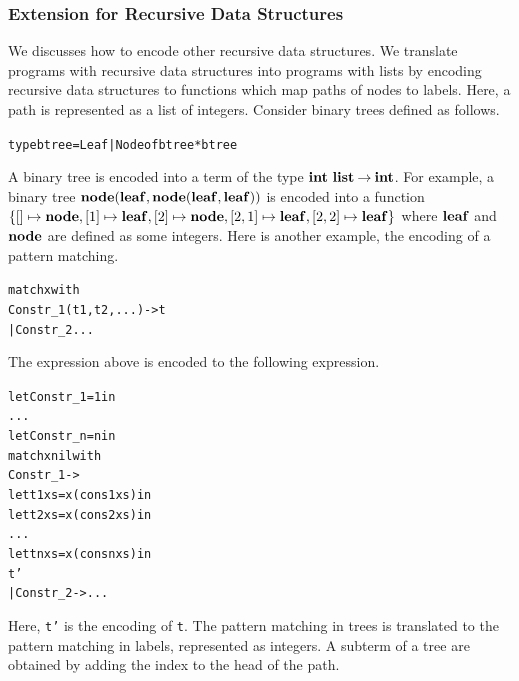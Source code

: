 


\subsubsection{Extension for Recursive Data Structures}
We discusses how to encode other recursive data structures.
We translate programs with recursive data structures into programs
with lists by encoding recursive data structures to functions which map
paths of nodes to labels.  Here, a path is represented as a list of integers.
Consider binary trees defined as follows.
\begin{alltt}
type btree = Leaf | Node of btree * btree
\end{alltt}
A binary tree is encoded into a term of the type
${{\mathbf{int}}\ \mathbf{list}}\mathbin{\rightarrow}{\mathbf{int}}$.  For example, a binary tree
$\mathbf{node}({\mathbf{leaf}},{\mathbf{node}({\mathbf{leaf}},{\mathbf{leaf}})})$ is encoded into a function $\{[]
\mapsto \mathbf{node}, [1] \mapsto \mathbf{leaf}, [2] \mapsto \mathbf{node}, [2,1] \mapsto
\mathbf{leaf}, [2,2] \mapsto \mathbf{leaf}\}$ where $\mathbf{leaf}$ and $\mathbf{node}$ are defined as
some integers.
Here is another example, the encoding of a pattern matching.
\begin{alltt}
match x with
  Constr_1 (t1, t2, ...) -> t
| Constr_2 ...
\end{alltt}
The expression above is encoded to the following expression.
\begin{alltt}
let Constr_1 = 1 in
  ...
let Constr_n = n in
  match x nil with
    Constr_1 ->
      let t1 xs = x (cons 1 xs) in
      let t2 xs = x (cons 2 xs) in
        ...
      let tn xs = x (cons n xs) in
        t'
  | Constr_2 -> ...
\end{alltt}
Here, \texttt{t'} is the encoding of \texttt{t}. The pattern matching in
trees is translated to the pattern matching in labels, represented as
integers.  A subterm of a tree are obtained by adding the index to the head of the path.

